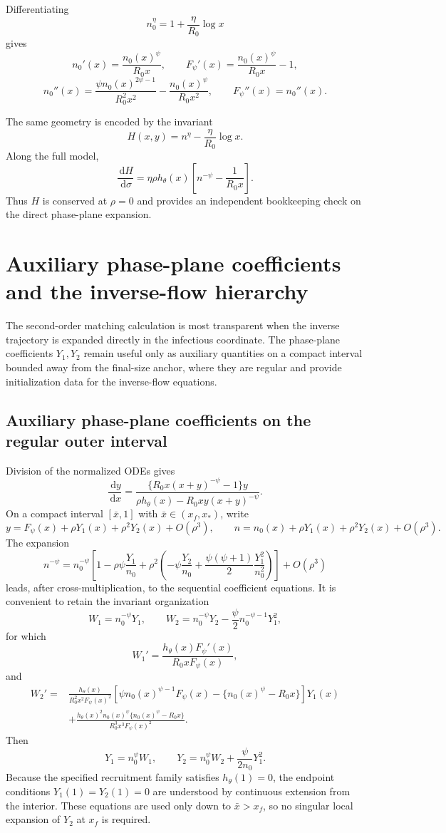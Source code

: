 \documentclass[11pt]{article}
\newcommand{\Rzero}{R_0}
\newcommand{\hth}{h_\theta}
\newcommand{\Fpsi}{F_\psi}
\newcommand{\xf}{x_f}
\newcommand{\xs}{x_*}
\newcommand{\dd}{\,\mathrm{d}}
\begin{document}
Differentiating
\[
n_0^\eta=1+\frac\eta{\Rzero}\log x
\]
gives
\[
n_0'(x)=\frac{n_0(x)^\psi}{\Rzero x},
\qquad
\Fpsi'(x)=\frac{n_0(x)^\psi}{\Rzero x}-1,
\]
\[
n_0''(x)
=\frac{\psi n_0(x)^{2\psi-1}}{\Rzero^2x^2}
-\frac{n_0(x)^\psi}{\Rzero x^2},
\qquad
\Fpsi''(x)=n_0''(x).
\]

The same geometry is encoded by the invariant
\[
H(x,y)=n^\eta-\frac\eta{\Rzero}\log x.
\]
Along the full model,
\[
\frac{\dd H}{\dd\sigma}
=\eta\rho\hth(x)
\left[n^{-\psi}-\frac1{\Rzero x}\right].
\]
Thus \(H\) is conserved at \(\rho=0\) and provides an independent bookkeeping check on the direct phase-plane expansion.


\section{Auxiliary phase-plane coefficients and the inverse-flow hierarchy}

The second-order matching calculation is most transparent when the inverse trajectory is expanded directly in the infectious coordinate.  The phase-plane coefficients \(Y_1,Y_2\) remain useful only as auxiliary quantities on a compact interval bounded away from the final-size anchor, where they are regular and provide initialization data for the inverse-flow equations.

\subsection{Auxiliary phase-plane coefficients on the regular outer interval}
Division of the normalized ODEs gives
\[
\frac{\dd y}{\dd x}
=
\frac{\{\Rzero x(x+y)^{-\psi}-1\}y}
{\rho\hth(x)-\Rzero xy(x+y)^{-\psi}}.
\]
On a compact interval \([\bar x,1]\) with \(\bar x\in(\xf,\xs)\), write
\[
y=\Fpsi(x)+\rho Y_1(x)+\rho^2Y_2(x)+O(\rho^3),
\qquad
n=n_0(x)+\rho Y_1(x)+\rho^2Y_2(x)+O(\rho^3).
\]
The expansion
\[
n^{-\psi}=n_0^{-\psi}
\left[
1-\rho\psi\frac{Y_1}{n_0}
+\rho^2\left(
-\psi\frac{Y_2}{n_0}
+\frac{\psi(\psi+1)}2\frac{Y_1^2}{n_0^2}
\right)
\right]+O(\rho^3)
\]
leads, after cross-multiplication, to the sequential coefficient equations.  It is convenient to retain the invariant organization
\[
W_1=n_0^{-\psi}Y_1,
\qquad
W_2=n_0^{-\psi}Y_2-\frac\psi2n_0^{-\psi-1}Y_1^2,
\]
for which
\[
W_1'
=\frac{\hth(x)\Fpsi'(x)}{\Rzero x\Fpsi(x)},
\]
and
\[
\begin{aligned}
W_2'={}&
\frac{\hth(x)}{\Rzero^2x^2\Fpsi(x)^2}
\left[
\psi n_0(x)^{\psi-1}\Fpsi(x)
-\{n_0(x)^\psi-\Rzero x\}
\right]Y_1(x)\\
&+\frac{\hth(x)^2n_0(x)^\psi\{n_0(x)^\psi-\Rzero x\}}
{\Rzero^3x^3\Fpsi(x)^2}.
\end{aligned}
\]
Then
\[
Y_1=n_0^\psi W_1,
\qquad
Y_2=n_0^\psi W_2+\frac\psi{2n_0}Y_1^2.
\]
Because the specified recruitment family satisfies \(h_\theta(1)=0\), the endpoint conditions \(Y_1(1)=Y_2(1)=0\) are understood by continuous extension from the interior.  These equations are used only down to \(\bar x>\xf\), so no singular local expansion of \(Y_2\) at \(\xf\) is required.
\end{document}
